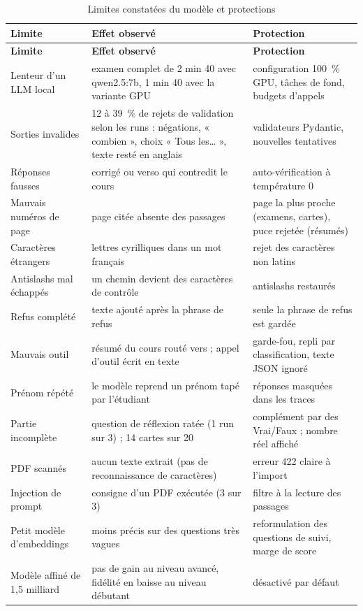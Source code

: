 \documentclass[12pt,a4paper]{report}
\DeclareRobustCommand{\code}[1]{\texttt{\codecasse{#1}}}
\begin{document}
\begin{longtable}{@{}P{3.6cm}P{5.6cm}P{5.6cm}@{}}
\caption{Limites constatées du modèle et protections}
\label{tab:limites-modele}\\
\toprule
\textbf{Limite} & \textbf{Effet observé} & \textbf{Protection} \\
\midrule
\endfirsthead
\toprule
\textbf{Limite} & \textbf{Effet observé} & \textbf{Protection} \\
\midrule
\endhead
Lenteur d'un LLM local & examen complet de 2 min 40 avec qwen2.5:7b, 1 min 40 avec la variante GPU & configuration 100~\% GPU, tâches de fond, budgets d'appels \\
Sorties invalides & 12 à 39~\% de rejets de validation selon les runs : négations, « combien », choix « Tous les… », texte resté en anglais & validateurs Pydantic, nouvelles tentatives \\
Réponses fausses & corrigé ou verso qui contredit le cours & auto-vérification à température 0 \\
Mauvais numéros de page & page citée absente des passages & page la plus proche (examens, cartes), puce rejetée (résumés) \\
Caractères étrangers & lettres cyrilliques dans un mot français & rejet des caractères non latins \\
Antislashs mal échappés & un chemin devient des caractères de contrôle & antislashs restaurés \\
Refus complété & texte ajouté après la phrase de refus & seule la phrase de refus est gardée \\
Mauvais outil & résumé du cours routé vers \code{ask_course} ; appel d'outil écrit en texte & garde-fou, repli par classification, texte JSON ignoré \\
Prénom répété & le modèle reprend un prénom tapé par l'étudiant & réponses masquées dans les traces \\
Partie incomplète & question de réflexion ratée (1 run sur 3) ; 14 cartes sur 20 & complément par des Vrai/Faux ; nombre réel affiché \\
PDF scannés & aucun texte extrait (pas de reconnaissance de caractères) & erreur 422 claire à l'import \\
Injection de prompt & consigne d'un PDF exécutée (3 sur 3) & filtre à la lecture des passages \\
Petit modèle d'embeddings & moins précis sur des questions très vagues & reformulation des questions de suivi, marge de score \\
Modèle affiné de 1,5 milliard & pas de gain au niveau avancé, fidélité en baisse au niveau débutant & désactivé par défaut \\
\bottomrule
\end{longtable}
\end{document}
